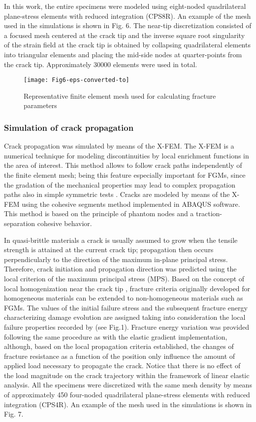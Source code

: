 In this work, the entire specimens were modeled using eight-noded quadrilateral plane-stress elements with reduced integration (CPS8R). An example of the mesh used in the simulations is shown in Fig. 6. The near-tip discretization consisted of a focused mesh centered at the crack tip and the inverse square root singularity of the strain field at the crack tip is obtained by collapsing quadrilateral elements into triangular elements and placing the mid-side nodes at quarter-points from the crack tip. Approximately 30000 elements were used in total. 

\begin{figure}[htbp]
\centering
\texttt{[image: Fig6-eps-converted-to]}
\caption{Representative finite element mesh used for calculating fracture parameters}
\label{fig:Fig6}
\end{figure}

\subsubsection{Simulation of crack propagation}

Crack propagation was simulated by means of the X-FEM. The X-FEM is a numerical technique for modeling discontinuities by local enrichment functions in the area of interest. This method allows to follow crack paths independently of the finite element mesh; being this feature especially important for FGMs, since the gradation of the mechanical properties may lead to complex propagation paths also in simple symmetric tests \citep{Rousseau2000}. Cracks are modeled by means of the X-FEM using the cohesive segments method \citep{Remmers2008} implemented in ABAQUS software. This method is based on the principle of phantom nodes \citep{Song2006} and a traction-separation cohesive behavior.

In quasi-brittle materials a crack is usually assumed to grow when the tensile strength is attained at the current crack tip; propagation then occurs perpendicularly to the direction of the maximum in-plane principal stress. Therefore, crack initiation and propagation direction was predicted using the local criterion of the maximum principal stress (MPS). Based on the concept of local homogenization near the crack tip \citep{Gu1997b}, fracture criteria originally developed for homogeneous materials can be extended to non-homogeneous materials such as FGMs. The values of the initial failure stress and the subsequent fracture energy characterizing damage evolution are assigned taking into consideration the local failure properties recorded by \cite{Abanto-Bueno2006} (see Fig.1). Fracture energy variation was provided following the same procedure as with the elastic gradient implementation, although, based on the local propagation criteria established, the changes of fracture resistance as a function of the position only influence the amount of applied load necessary to propagate the crack. Notice that there is no effect of the load magnitude on the crack trajectory within the framework of linear elastic analysis. All the specimens were discretized with the same mesh density by means of approximately 450 four-noded quadrilateral plane-stress elements with reduced integration (CPS4R). An example of the mesh used in the simulations is shown in Fig. 7.

